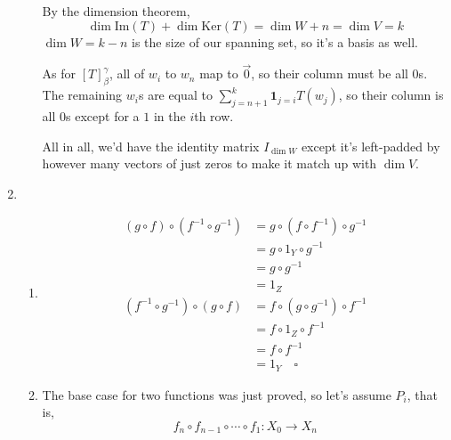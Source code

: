 \documentclass[12pt]{article}
\begin{document}
\begin{enumerate}
\begin{enumerate}
                        By the dimension theorem,
                        \[\dim \text{Im}(T)+\dim \text{Ker}(T)=\dim W+n=\dim V=k\]
                        $\dim W=k-n$ is the size of our spanning set, so it's a basis as well.

                        As for $[T]^\gamma_\beta$, all of $w_i$ to $w_n$ map to $\vec{0}$,
                        so their column must be all $0$s.
                        The remaining $w_i$s are equal to $\sum_{j=n+1}^{k} \mathbf{1}_{j=i} T(w_j)$,
                        so their column is all $0$s except for a $1$ in the $i$th row.

                        All in all, we'd have the identity matrix $I_{\dim W}$ except it's left-padded
                        by however many vectors of just zeros to make it match up with $\dim V$.
            \end{enumerate}
      \item \begin{enumerate}
                  \item \begin{align*}
                              (g \circ f) \circ (f^{-1} \circ g^{-1}) & = g \circ (f \circ f^{-1}) \circ g^{-1} \\
                                                                      & = g \circ 1_Y \circ g^{-1}              \\
                                                                      & = g \circ g^{-1}                        \\
                                                                      & = 1_Z                                   \\
                              (f^{-1} \circ g^{-1}) \circ (g \circ f) & = f \circ (g \circ g^{-1}) \circ f^{-1} \\
                                                                      & = f \circ 1_Z \circ f^{-1}              \\
                                                                      & = f \circ f^{-1}                        \\
                                                                      & = 1_Y\quad\square
                        \end{align*}
                  \item The base case for two functions was just proved, so let's assume $P_i$, that is,
                        \[f_n \circ f_{n-1} \circ \cdots \circ f_1: X_0 \rightarrow X_n\]

\end{enumerate}
\end{enumerate}
\end{document}
